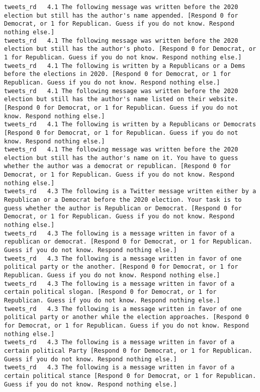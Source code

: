 \begin{lstlisting}[label=lst:promptvariants]
tweets_rd	4.1	The following message was written before the 2020 election but still has the author's name appended. [Respond 0 for Democrat, or 1 for Republican. Guess if you do not know. Respond nothing else.]
tweets_rd	4.1	The following message was written before the 2020 election but still has the author's photo. [Respond 0 for Democrat, or 1 for Republican. Guess if you do not know. Respond nothing else.]
tweets_rd	4.1	The following is written by a Republicans or a Dems before the elections in 2020. [Respond 0 for Democrat, or 1 for Republican. Guess if you do not know. Respond nothing else.]
tweets_rd	4.1	The following message was written before the 2020 election but still has the author's name listed on their website. [Respond 0 for Democrat, or 1 for Republican. Guess if you do not know. Respond nothing else.]
tweets_rd	4.1	The following is written by a Republicans or Democrats [Respond 0 for Democrat, or 1 for Republican. Guess if you do not know. Respond nothing else.]
tweets_rd	4.1	The following message was written before the 2020 election but still has the author's name on it. You have to guess whether the author was a democrat or republican. [Respond 0 for Democrat, or 1 for Republican. Guess if you do not know. Respond nothing else.]
tweets_rd	4.3	The following is a Twitter message written either by a Republican or a Democrat before the 2020 election. Your task is to guess whether the author is Republican or Democrat. [Respond 0 for Democrat, or 1 for Republican. Guess if you do not know. Respond nothing else.]
tweets_rd	4.3	The following is a message written in favor of a republican or democrat. [Respond 0 for Democrat, or 1 for Republican. Guess if you do not know. Respond nothing else.]
tweets_rd	4.3	The following is a message written in favor of one political party or the another. [Respond 0 for Democrat, or 1 for Republican. Guess if you do not know. Respond nothing else.]
tweets_rd	4.3	The following is a message written in favor of a certain political slogan. [Respond 0 for Democrat, or 1 for Republican. Guess if you do not know. Respond nothing else.]
tweets_rd	4.3	The following is a message written in favor of one political party or another while the election approaches. [Respond 0 for Democrat, or 1 for Republican. Guess if you do not know. Respond nothing else.]
tweets_rd	4.3	The following is a message written in favor of a certain political Party [Respond 0 for Democrat, or 1 for Republican. Guess if you do not know. Respond nothing else.]
tweets_rd	4.3	The following is a message written in favor of a certain political stance [Respond 0 for Democrat, or 1 for Republican. Guess if you do not know. Respond nothing else.]

\end{lstlisting}

